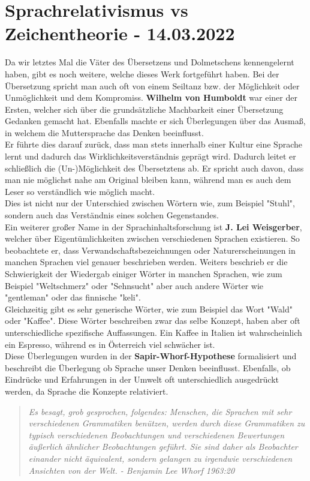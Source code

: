 \documentclass{article}
\begin{document}
	\section{Sprachrelativismus vs Zeichentheorie - 14.03.2022}
	Da wir letztes Mal die Väter des Übersetzens und Dolmetschens kennengelernt haben, gibt es noch weitere, welche dieses Werk fortgeführt haben. Bei der Übersetzung spricht man auch oft von einem Seiltanz bzw. der Möglichkeit oder Unmöglichkeit und dem Kompromiss. \textbf{Wilhelm von Humboldt} war einer der Ersten, welcher sich über die grundsätzliche Machbarkeit einer Übersetzung Gedanken gemacht hat. Ebenfalls machte er sich Überlegungen über das Ausmaß, in welchem die Muttersprache das Denken beeinflusst. \\
	Er führte dies darauf zurück, dass man stets innerhalb einer Kultur eine Sprache lernt und dadurch das Wirklichkeitsverständnis geprägt wird. Dadurch leitet er schließlich die (Un-)Möglichkeit des Übersetztens ab. Er spricht auch davon, dass man nie möglichst nahe am Original bleiben kann, während man es auch dem Leser so verständlich wie möglich macht. \\
	Dies ist nicht nur der Unterschied zwischen Wörtern wie, zum Beispiel "Stuhl", sondern auch das Verständnis eines solchen Gegenstandes. \\
	Ein weiterer großer Name in der Sprachinhaltsforschung ist \textbf{J. Lei Weisgerber}, welcher über Eigentümlichkeiten zwischen verschiedenen Sprachen existieren. So beobachtete er, dass Verwandschaftsbezeichnungen oder Naturerscheinungen in manchen Sprachen viel genauer beschrieben werden. Weiters beschrieb er die Schwierigkeit der Wiedergab einiger Wörter in manchen Sprachen, wie zum Beispiel "Weltschmerz" oder "Sehnsucht" aber auch andere Wörter wie "gentleman" oder das finnische "keli". \\
	Gleichzeitig gibt es sehr generische Wörter, wie zum Beispiel das Wort "Wald" oder "Kaffee". Diese Wörter beschreiben zwar das selbe Konzept, haben aber oft unterschiedliche spezifische Auffassungen. Ein Kaffee in Italien ist wahrscheinlich ein Espresso, während es in Österreich viel schwächer ist. \\
	Diese Überlegungen wurden in der \textbf{Sapir-Whorf-Hypothese} formalisiert und beschreibt die Überlegung ob Sprache unser Denken beeinflusst. Ebenfalls, ob Eindrücke und Erfahrungen in der Umwelt oft unterschiedlich ausgedrückt werden, da Sprache die Konzepte relativiert. \\
	\begin{quote}
	\textit{Es besagt, grob gesprochen, folgendes: Menschen, die Sprachen mit sehr verschiedenen Grammatiken benützen, werden durch diese Grammatiken zu typisch verschiedenen Beobachtungen und verschiedenen Bewertungen äußerlich ähnlicher Beobachtungen geführt. Sie sind daher als Beobachter einander nicht äquivalent, sondern gelangen zu irgendwie verschiedenen Ansichten von der Welt. - Benjamin Lee Whorf 1963:20}
	\end{quote}
\end{document}
